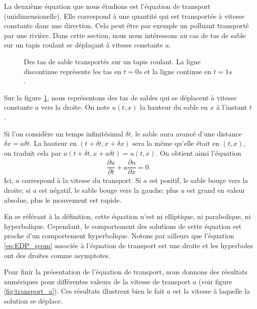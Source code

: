 \documentclass[12pt,a4paper,twoside]{article}
\begin{document}
La deuxi\`eme \'equation que nous \'etudions est l'\'equation de transport
(unidimensionelle).
Elle correspond \`a une quantit\'e qui est transport\'ee \`a vitesse
constante dans une direction.
Cela peut \^etre par exemple un polluant transport\'e par une rivi\`ere.
Dans cette section, nous nous int\'eressons au cas de tas de sable
sur un tapis roulant se d\'epla\c{c}ant \`a vitesse constante $a$.


\begin{figure}
\centering
\begin{tikzpicture}[scale = 0.5]
  
\end{tikzpicture}
\caption{Des tas de sable transport\'es sur un tapis roulant.
  La ligne discontinue repr\'esente les tas en $t=0s$ et la ligne
  continue en $t=1s$.}
\label{fig:transport}
\end{figure}

Sur la figure \ref{fig:transport}, nous repr\'esentons des tas de sables
qui se d\'eplacent \`a vitesse constante $a$ vers la droite.
On note $u(t,x)$ la hauteur du sable en $x$ \`a l'instant $t$.

Si l'on consid\`ere un temps infinit\'esimal $\delta t$,
le sable aura avanc\'e d'une distance $\delta x = a \delta t$.
La hauteur en $(t+\delta t , x + \delta x)$ sera la m\^eme qu'elle
\'etait en $(t,x)$, on traduit cela par $u(t+\delta t, x + a \delta t) = u(t,x)$.
On obtient ainsi l'\'equation
\begin{align}
  \dfrac{\partial u}{\partial t} + a \dfrac{\partial u}{\partial x} = 0 .
\end{align}
Ici, $a$ correspond \`a la vitesse du transport.
Si $a$ est positif, le sable bouge vers la droite; si $a$ est n\'egatif,
le sable bouge vers la gauche; plus $a$ est grand en valeur absolue, 
plus le mouvement est rapide.


\begin{remark}
  En se r\'ef\'erant \`a la d\'efinition, cette \'equation n'est ni elliptique, 
  ni parabolique, ni hyperbolique. Cependant, le comportement des solutions de 
  cette \'equation est proche d'un comportement hyperbolique.
  Notons par ailleurs que l'\'equation \eqref{eq:EDP_geom} associ\'ee
  \`a l'\'equation de transport est une droite et les hyperboles ont des droites
  comme asymptotes.
\end{remark}

Pour finir la pr\'esentation de l'\'equation de transport,
nous donnons des r\'esultats num\'eriques pour diff\'erentes
valeurs de la vitesse de transport $a$ (voir figure \ref{fig:transport_a}).
Ces r\'esultats illustrent bien le fait $a$ est la vitesse \`a laquelle
la solution se d\'eplace.
\end{document}
